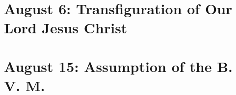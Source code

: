 {{\def\definevesperspropers{
  \def\prepsalmfive{\greseteolcustos{manual}}
}
\def\definevesperspropersalt{}
\def\vesperspropersnote{At II Vespers:}
\def\vesperspropersaltnote{At I Vespers:}
\def\premagverses{\greseteolcustos{manual}}

\def\begincollectcols{\begin{parcolumns}[rulebetween,colwidths={1=0.45\linewidth}]{2}}
\bigskip
\benedicamusdomino{}
}

{
\section{August 6: Transfiguration of Our Lord Jesus Christ}
\subtitle{ Class}
\subtitle{I \& II Vespers}

\def\definevesperspropers{
  \def\prepsalmfive{\greseteolcustos{manual}}
}
\def\definevesperspropersalt{}
\def\vesperspropersnote{At II Vespers:}
\def\vesperspropersaltnote{At I Vespers:}
\def\premagverses{\greseteolcustos{manual}}

\def\begincollectcols{\begin{parcolumns}[rulebetween,colwidths={1=0.44\linewidth}]{2}}
\bigskip
\benedicamusdomino[2]{}
}

{
\section{August 15: Assumption of the B. V. M.}
\subtitle{ Class}
\subtitle{I \& II Vespers}

\def\definevesperspropers{
  \def\prepsalmfive{\greseteolcustos{manual}}
}
\def\definevesperspropersalt{}
\def\vesperspropersnote{At II Vespers:}
\def\vesperspropersaltnote{At I Vespers:}
\def\premagverses{\greseteolcustos{manual}}
\def\printfullhymn{
  {
    \oldneedspace{3\baselineskip}
    \printnote{At II Vespers: Hymn. \emph{Ave Maris Stella}, p. \pageref{hymn-avemarisstella}. \Vbar{} \emph{Exaltata.} p. \pageref{vr-assumption}.\\}

}}}}
